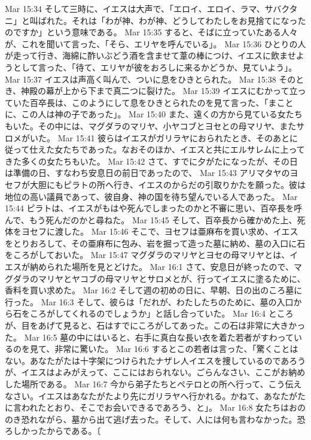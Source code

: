 Mar 15:34  そして三時に、イエスは大声で、「エロイ、エロイ、ラマ、サバクタニ」と叫ばれた。それは「わが神、わが神、どうしてわたしをお見捨てになったのですか」という意味である。
Mar 15:35  すると、そばに立っていたある人々が、これを聞いて言った、「そら、エリヤを呼んでいる」。
Mar 15:36  ひとりの人が走って行き、海綿に酢いぶどう酒を含ませて葦の棒につけ、イエスに飲ませようとして言った、「待て、エリヤが彼をおろしに来るかどうか、見ていよう」。
Mar 15:37  イエスは声高く叫んで、ついに息をひきとられた。
Mar 15:38  そのとき、神殿の幕が上から下まで真二つに裂けた。
Mar 15:39  イエスにむかって立っていた百卒長は、このようにして息をひきとられたのを見て言った、「まことに、この人は神の子であった」。
Mar 15:40  また、遠くの方から見ている女たちもいた。その中には、マグダラのマリヤ、小ヤコブとヨセとの母マリヤ、またサロメがいた。
Mar 15:41  彼らはイエスがガリラヤにおられたとき、そのあとに従って仕えた女たちであった。なおそのほか、イエスと共にエルサレムに上ってきた多くの女たちもいた。
Mar 15:42  さて、すでに夕がたになったが、その日は準備の日、すなわち安息日の前日であったので、
Mar 15:43  アリマタヤのヨセフが大胆にもピラトの所へ行き、イエスのからだの引取りかたを願った。彼は地位の高い議員であって、彼自身、神の国を待ち望んでいる人であった。
Mar 15:44  ピラトは、イエスがもはや死んでしまったのかと不審に思い、百卒長を呼んで、もう死んだのかと尋ねた。
Mar 15:45  そして、百卒長から確かめた上、死体をヨセフに渡した。
Mar 15:46  そこで、ヨセフは亜麻布を買い求め、イエスをとりおろして、その亜麻布に包み、岩を掘って造った墓に納め、墓の入口に石をころがしておいた。
Mar 15:47  マグダラのマリヤとヨセの母マリヤとは、イエスが納められた場所を見とどけた。
Mar 16:1  さて、安息日が終ったので、マグダラのマリヤとヤコブの母マリヤとサロメとが、行ってイエスに塗るために、香料を買い求めた。
Mar 16:2  そして週の初めの日に、早朝、日の出のころ墓に行った。
Mar 16:3  そして、彼らは「だれが、わたしたちのために、墓の入口から石をころがしてくれるのでしょうか」と話し合っていた。
Mar 16:4  ところが、目をあげて見ると、石はすでにころがしてあった。この石は非常に大きかった。
Mar 16:5  墓の中にはいると、右手に真白な長い衣を着た若者がすわっているのを見て、非常に驚いた。
Mar 16:6  するとこの若者は言った、「驚くことはない。あなたがたは十字架につけられたナザレ人イエスを捜しているのであろうが、イエスはよみがえって、ここにはおられない。ごらんなさい、ここがお納めした場所である。
Mar 16:7  今から弟子たちとペテロとの所へ行って、こう伝えなさい。イエスはあなたがたより先にガリラヤへ行かれる。かねて、あなたがたに言われたとおり、そこでお会いできるであろう、と」。
Mar 16:8  女たちはおののき恐れながら、墓から出て逃げ去った。そして、人には何も言わなかった。恐ろしかったからである。〔
